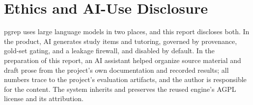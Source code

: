 \documentclass[11pt]{article}
\begin{document}
\section*{Ethics and AI-Use Disclosure}

pgrep uses large language models in two places, and this report discloses both. In
the product, AI generates study items and tutoring, governed by provenance,
gold-set gating, and a leakage firewall, and disabled by default. In the preparation
of this report, an AI assistant helped organize source material and draft prose from
the project's own documentation and recorded results; all numbers trace to the
project's evaluation artifacts, and the author is responsible for the content. The
system inherits and preserves the reused engine's AGPL license and its attribution.



\end{document}
